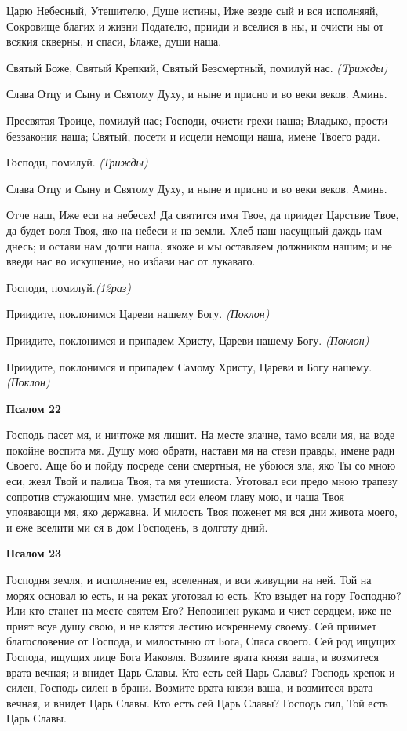 Царю Небесный, Утешителю, Душе истины, Иже везде сый и вся исполняяй, Сокровище благих и жизни Подателю, прииди и вселися в ны, и очисти ны от всякия скверны, и спаси, Блаже, души наша.


Святый Боже, Святый Крепкий, Святый Безсмертный, помилуй нас. \itshape (Tрижды)\normalfont{}


Слава Отцу и Сыну и Святому Духу, и ныне и присно и во веки веков. Аминь.


Пресвятая Троице, помилуй нас; Господи, очисти грехи наша; Владыко, прости беззакония наша; Святый, посети и исцели немощи наша, имене Твоего ради.


Господи, помилуй. \itshape (Трижды)\normalfont{}


Слава Отцу и Сыну и Святому Духу, и ныне и присно и во веки веков. Аминь.


Отче наш, Иже еси на небесех! Да святится имя Твое, да приидет Царствие Твое, да будет воля Твоя, яко на небеси и на земли. Хлеб наш насущный даждь нам днесь; и остави нам долги наша, якоже и мы оставляем должником нашим; и не введи нас во искушение, но избави нас от лукаваго.


Господи, помилуй.\itshape  (12раз)\normalfont{}


Приидите, поклонимся Цареви нашему Богу. \itshape (Поклон)\normalfont{}


Приидите, поклонимся и припадем Христу, Цареви нашему Богу. \itshape (Поклон)\normalfont{}


Приидите, поклонимся и припадем Самому Христу, Цареви и Богу нашему.\itshape (Поклон)\normalfont{}


\medskip
\bfseries Псалом 22\normalfont{}\nopagebreak


Господь пасет мя, и ничтоже мя лишит. На месте злачне, тамо всели мя, на воде покойне воспита мя. Душу мою обрати, настави мя на стези правды, имене ради Своего. Аще бо и пойду посреде сени смертныя, не убоюся зла, яко Ты со мною еси, жезл Твой и палица Твоя, та мя утешиста. Уготовал еси предо мною трапезу сопротив стужающим мне, умастил еси елеом главу мою, и чаша Твоя упоявающи мя, яко державна. И милость Твоя поженет мя вся дни живота моего, и еже вселити ми ся в дом Господень, в долготу дний.


\medskip
\bfseries Псалом 23\normalfont{}\nopagebreak


Господня земля, и исполнение ея, вселенная, и вси живущии на ней. Той на морях основал ю есть, и на реках уготовал ю есть. Кто взыдет на гору Господню? Или кто станет на месте святем Его? Неповинен рукама и чист сердцем, иже не прият всуе душу свою, и не клятся лестию искреннему своему. Сей приимет благословение от Господа, и милостыню от Бога, Спаса своего. Сей род ищущих Господа, ищущих лице Бога Иаковля. Возмите врата князи ваша, и возмитеся врата вечная; и внидет Царь Славы. Кто есть сей Царь Славы? Господь крепок и силен, Господь силен в брани. Возмите врата князи ваша, и возмитеся врата вечная, и внидет Царь Славы. Кто есть сей Царь Славы? Господь сил, Той есть Царь Славы.


